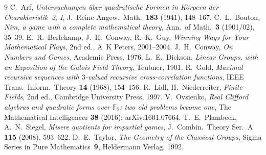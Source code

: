 \documentclass[11pt]{article}
\theoremstyle{definition}
\newcommand{\F}{\mathbb{F}}
\begin{document}
\begin{thebibliography}{9}
 C.~Arf, \emph{Untersuchungen \"uber quadratische Formen in
K\"orpern der Charakteristik~2, I}, J.\ Reine Angew.\ Math.\ \textbf{183}
(1941), 148--167.
 C.~L.~Bouton, \emph{Nim, a game with a complete mathematical
theory}, Ann.\ of Math.\ \textbf{3} (1901/02), 35--39.
 E.~R.~Berlekamp, J.~H.~Conway, R.~K.~Guy, \emph{Winning Ways for
Your Mathematical Plays}, 2nd ed., A~K Peters, 2001--2004.
 J.~H.~Conway, \emph{On Numbers and Games}, Academic Press,
1976.
 L.~E.~Dickson, \emph{Linear Groups, with an Exposition of
the Galois Field Theory}, Teubner, 1901.
 R.~Gold, \emph{Maximal recursive sequences with $3$-valued
recursive cross-correlation functions}, IEEE Trans.\ Inform.\ Theory
\textbf{14} (1968), 154--156.
 R.~Lidl, H.~Niederreiter, \emph{Finite Fields}, 2nd ed.,
Cambridge University Press, 1997.
 V.~Ovsienko, \emph{Real Clifford algebras and quadratic
forms over $\F_2$: two old problems become one}, The Mathematical Intelligencer
\textbf{38} (2016); arXiv:1601.07664.
 T.~E.~Plambeck, A.~N.~Siegel, \emph{Misere quotients for impartial
games}, J.\ Combin.\ Theory Ser.\ A \textbf{115} (2008), 593--622.
 D.~E.~Taylor, \emph{The Geometry of the Classical Groups},
Sigma Series in Pure Mathematics~\textbf{9}, Heldermann Verlag, 1992.
\end{thebibliography}
\end{document}
